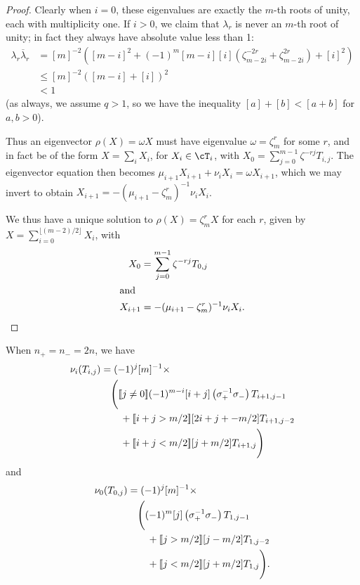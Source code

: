\documentclass[12pt]{article}
\begin{document}
\begin{proof}
Clearly when $i = 0$, these eigenvalues are exactly the $m$-th roots of unity, each with multiplicity one.
If $i > 0$, we claim that $\lambda_{r}$ is never an $m$-th root of unity; in fact they always have absolute value less than 1:
\begin{align*}
\lambda_{r} \overline{\lambda}_{r} 
 & = [m]^{-2}\left([m-i]^{2}+(-1)^{m}[m-i][i]\left(\zeta_{m-2i}^{-2r}+\zeta_{m-2i}^{2r}\right)+[i]^{2}\right) \\ 
 & \le [m]^{-2}\left([m-i]+[i]\right)^{2} \\
 & < 1
\end{align*}
(as always, we assume $q>1$, so we have the inequality $[a] + [b] < [a+b]$ for $a,b>0$).


Thus an eigenvector $\rho(X) = \omega X$ must have eigenvalue $\omega  = \zeta_m^r$ for some $r$, and in fact be of the form $X = \sum_i X_i$, for $X_i \in \cT_i$, with $X_0 = \sum_{j=0}^{m-1} \zeta^{-rj} T_{i,j}$. The eigenvector equation then becomes $\mu_{i+1} X_{i+1} + \nu_i X_i = \omega X_{i+1}$, which we may invert to obtain $X_{i+1} = - (\mu_{i+1} - \zeta_m^r)^{-1} \nu_i X_i$.

We thus have a unique solution to $\rho(X) = \zeta_m^r X$ for each $r$, given by $X = \sum_{i=0}^{\lfloor(m-2)/2\rfloor} X_i$, with
\begin{align*}
X_0 & = \sum_{j=0}^{m-1} \zeta^{-rj} T_{0,j} \\
\intertext{and}
X_{i+1} & = - (\mu_{i+1} - \zeta_m^r)^{-1} \nu_i X_i.
\qedhere
\end{align*}
\end{proof}





\begin{lem}
\label{lem:nu0}
When $n_+ = n_- = 2n$, we have
\begin{align*}
\nu_i(T_{i,j})
& = (-1)^j[m]^{-1} \times\\
& \quad \Bigg(
[\![ j \neq 0 ]\!](-1)^{m-i} [i+j] \left(\sigma_+^{-1} \sigma_-\right) T_{i+1, j-1} \\
& \qquad +
[\![ i+j > m/2 ]\!] [2i + j + -m/2] T_{i+1,j-2} \\
& \qquad +
[\![ i+j < m/2 ]\!] [j+ m/2 ] T_{i+1,j} \Bigg)
\end{align*}
and
\begin{align*}
\nu_0(T_{0,j})
& = (-1)^j [m]^{-1} \times \\
& \quad \Bigg(
(-1)^{m} [j] \left(\sigma_+^{-1} \sigma_-\right) T_{1, j-1} \\
& \qquad + [\![ j > m/2 ]\!] [j- m/2] T_{1,j - 2} \\
& \qquad + [\![ j < m/2 ]\!] [j+ m/2] T_{1,j} \Bigg).
\end{align*}
\end{lem}
\end{document}
